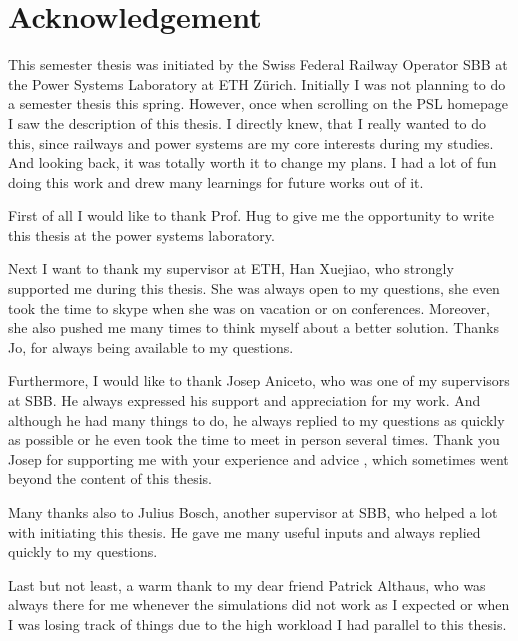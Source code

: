 
\chapter*{Acknowledgement}

This semester thesis was initiated by the Swiss Federal Railway Operator SBB at the Power Systems Laboratory at ETH Zürich. 
Initially I was not planning to do a semester thesis this spring. However, once when scrolling on the PSL homepage I saw the description of this thesis. I directly knew, that I really wanted to do this, since railways and power systems are my core interests during my studies. And looking back, it was totally worth it to change my plans. I had a lot of fun doing this work and drew many learnings for future works out of it. 


First of all I would like to thank Prof. Hug to give me the opportunity to write this thesis at the power systems laboratory. 


Next I want to thank my supervisor at ETH, Han Xuejiao, who strongly supported me during this thesis. She was always open to my questions, she even took the time to skype when she was on vacation or on conferences. Moreover, she also pushed me many times to think myself about a better solution. Thanks Jo, for always being available to my questions. 


Furthermore, I would like to thank Josep Aniceto, who was one of my supervisors at SBB. He always expressed his support and appreciation for my work. And although he had many things to do, he always replied to my questions as quickly as possible or he even took the time to meet in person several times. Thank you Josep for supporting me with your experience and advice , which sometimes went beyond the content of this thesis. 


Many thanks also to Julius Bosch, another supervisor at SBB, who helped a lot with initiating this thesis. He gave me many useful inputs and always replied quickly to my questions.  


Last but not least, a warm thank to my dear friend Patrick Althaus, who was always there for me whenever the simulations did not work as I expected or when I was losing track of things due to the high workload I had parallel to this thesis.